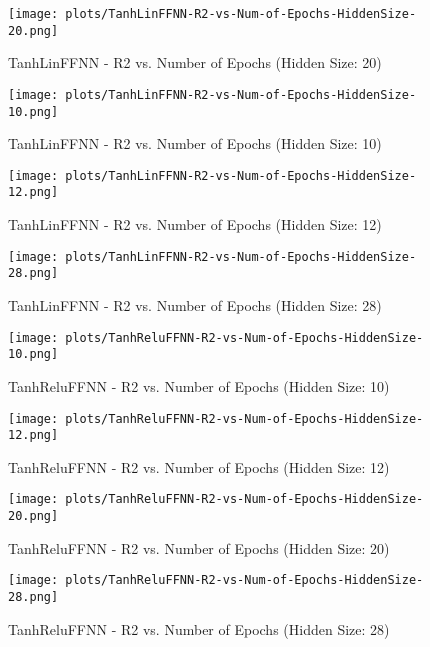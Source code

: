 \begin{figure}[H]
    \centering
    \texttt{[image: plots/TanhLinFFNN-R2-vs-Num-of-Epochs-HiddenSize-20.png]}
    \caption{TanhLinFFNN - R2 vs. Number of Epochs (Hidden Size: 20)}
\end{figure}

\begin{figure}[H]
    \centering
    \texttt{[image: plots/TanhLinFFNN-R2-vs-Num-of-Epochs-HiddenSize-10.png]}
    \caption{TanhLinFFNN - R2 vs. Number of Epochs (Hidden Size: 10)}
\end{figure}

\begin{figure}[H]
    \centering
    \texttt{[image: plots/TanhLinFFNN-R2-vs-Num-of-Epochs-HiddenSize-12.png]}
    \caption{TanhLinFFNN - R2 vs. Number of Epochs (Hidden Size: 12)}
\end{figure}

\begin{figure}[H]
    \centering
    \texttt{[image: plots/TanhLinFFNN-R2-vs-Num-of-Epochs-HiddenSize-28.png]}
    \caption{TanhLinFFNN - R2 vs. Number of Epochs (Hidden Size: 28)}
\end{figure}

\begin{figure}[H]
    \centering
    \texttt{[image: plots/TanhReluFFNN-R2-vs-Num-of-Epochs-HiddenSize-10.png]}
    \caption{TanhReluFFNN - R2 vs. Number of Epochs (Hidden Size: 10)}
\end{figure}

\begin{figure}[H]
    \centering
    \texttt{[image: plots/TanhReluFFNN-R2-vs-Num-of-Epochs-HiddenSize-12.png]}
    \caption{TanhReluFFNN - R2 vs. Number of Epochs (Hidden Size: 12)}
\end{figure}

\begin{figure}[H]
    \centering
    \texttt{[image: plots/TanhReluFFNN-R2-vs-Num-of-Epochs-HiddenSize-20.png]}
    \caption{TanhReluFFNN - R2 vs. Number of Epochs (Hidden Size: 20)}
\end{figure}

\begin{figure}[H]
    \centering
    \texttt{[image: plots/TanhReluFFNN-R2-vs-Num-of-Epochs-HiddenSize-28.png]}
    \caption{TanhReluFFNN - R2 vs. Number of Epochs (Hidden Size: 28)}
\end{figure}

